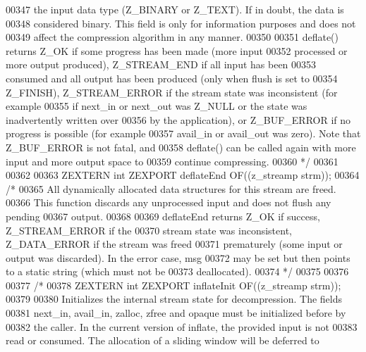 \begin{DoxyCode}
00347 \textcolor{comment}{  the input data type (Z\_BINARY or Z\_TEXT).  If in doubt, the data is}
00348 \textcolor{comment}{  considered binary.  This field is only for information purposes and does not}
00349 \textcolor{comment}{  affect the compression algorithm in any manner.}
00350 \textcolor{comment}{}
00351 \textcolor{comment}{    deflate() returns Z\_OK if some progress has been made (more input}
00352 \textcolor{comment}{  processed or more output produced), Z\_STREAM\_END if all input has been}
00353 \textcolor{comment}{  consumed and all output has been produced (only when flush is set to}
00354 \textcolor{comment}{  Z\_FINISH), Z\_STREAM\_ERROR if the stream state was inconsistent (for example}
00355 \textcolor{comment}{  if next\_in or next\_out was Z\_NULL or the state was inadvertently written over}
00356 \textcolor{comment}{  by the application), or Z\_BUF\_ERROR if no progress is possible (for example}
00357 \textcolor{comment}{  avail\_in or avail\_out was zero).  Note that Z\_BUF\_ERROR is not fatal, and}
00358 \textcolor{comment}{  deflate() can be called again with more input and more output space to}
00359 \textcolor{comment}{  continue compressing.}
00360 \textcolor{comment}{*/}
00361 
00362 
00363 ZEXTERN \textcolor{keywordtype}{int} ZEXPORT deflateEnd OF((z\_streamp strm));
00364 \textcolor{comment}{/*}
00365 \textcolor{comment}{     All dynamically allocated data structures for this stream are freed.}
00366 \textcolor{comment}{   This function discards any unprocessed input and does not flush any pending}
00367 \textcolor{comment}{   output.}
00368 \textcolor{comment}{}
00369 \textcolor{comment}{     deflateEnd returns Z\_OK if success, Z\_STREAM\_ERROR if the}
00370 \textcolor{comment}{   stream state was inconsistent, Z\_DATA\_ERROR if the stream was freed}
00371 \textcolor{comment}{   prematurely (some input or output was discarded).  In the error case, msg}
00372 \textcolor{comment}{   may be set but then points to a static string (which must not be}
00373 \textcolor{comment}{   deallocated).}
00374 \textcolor{comment}{*/}
00375 
00376 
00377 \textcolor{comment}{/*}
00378 \textcolor{comment}{ZEXTERN int ZEXPORT inflateInit OF((z\_streamp strm));}
00379 \textcolor{comment}{}
00380 \textcolor{comment}{     Initializes the internal stream state for decompression.  The fields}
00381 \textcolor{comment}{   next\_in, avail\_in, zalloc, zfree and opaque must be initialized before by}
00382 \textcolor{comment}{   the caller.  In the current version of inflate, the provided input is not}
00383 \textcolor{comment}{   read or consumed.  The allocation of a sliding window will be deferred to}

\end{DoxyCode}
